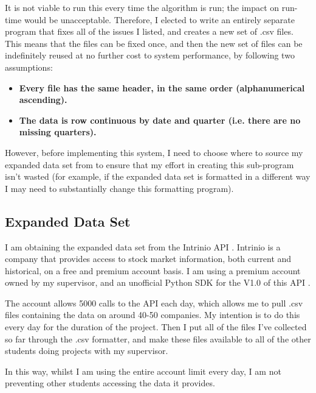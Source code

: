 It is not viable to run this every time the algorithm is run; the impact on run-time would be unacceptable. Therefore, I elected to write an entirely separate program that fixes all of the issues I listed, and creates a new set of .csv files. This means that the files can be fixed once, and then the new set of files can be indefinitely reused at no further cost to system performance, by following two assumptions:
\begin{itemize}
    \item \bf Every file has the same header, in the same order (alphanumerical ascending). \rm
    \item \bf The data is row continuous by date and quarter (i.e. there are no missing quarters). \rm
\end{itemize}

However, before implementing this system, I need to choose where to source my expanded data set from to ensure that my effort in creating this sub-program isn't wasted (for example, if the expanded data set is formatted in a different way I may need to substantially change this formatting program).

\subsection{Expanded Data Set} \label{expandedData}
I am obtaining the expanded data set from the Intrinio API \cite{intrinioApi}. Intrinio is a company that provides access to stock market information, both current and historical, on a free and premium account basis. I am using a premium account owned by my supervisor, and an unofficial Python SDK for the V1.0 of this API \cite{intrinioPython}. \newline

The account allows 5000 calls to the API each day, which allows me to pull .csv files containing the data on around 40-50 companies. My intention is to do this every day for the duration of the project. Then I put all of the files I've collected so far through the .csv formatter, and make these files available to all of the other students doing projects with my supervisor. \newline

In this way, whilst I am using the entire account limit every day, I am not preventing other students accessing the data it provides.

